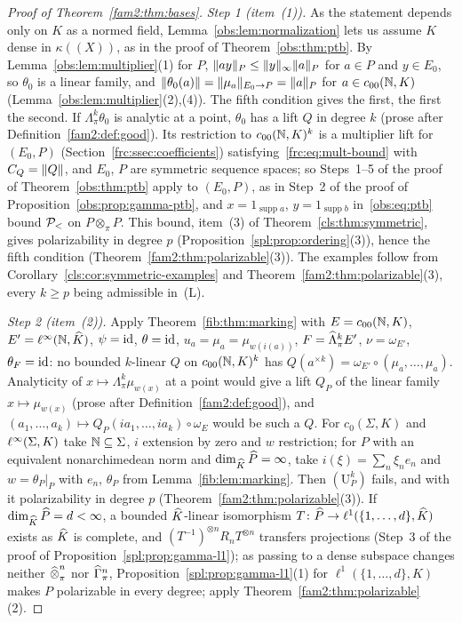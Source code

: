 \begin{proof}[Proof of Theorem~\ref{fam2:thm:bases}]
\emph{Step 1 (item~(1)).} As the statement depends only on $K$ as a normed field, Lemma~\ref{obs:lem:normalization} lets us
assume $K$ dense in $\kappa((X))$, as in the proof of Theorem~\ref{obs:thm:ptb}. By Lemma~\ref{obs:lem:multiplier}(1) for
$P$, $\lVert ay\rVert_P\le\lVert y\rVert_\infty\lVert a\rVert_P$ for $a\in P$ and $y\in E_0$, so $\theta_0$ is a linear family, and
$\lVert \theta_0(a)\rVert=\lVert \mu_a\rVert_{E_0\to P}=\lVert a\rVert_P$ for $a\in c_{00}(\mathbb N,K)$ (Lemma~\ref{obs:lem:multiplier}(2),(4)). The
fifth condition gives the first, the first the second. If $\Lambda^k_\pi\theta_0$ is analytic at a point, $\theta_0$ has a
lift $Q$ in degree $k$ (prose after Definition~\ref{fam2:def:good}). Its restriction to $c_{00}(\mathbb N,K)^k$ is a multiplier lift for
$(E_0,P)$ (Section~\ref{frc:ssec:coefficients}) satisfying~\eqref{frc:eq:mult-bound} with $C_Q=\lVert Q\rVert$, and $E_0$, $P$ are
symmetric sequence spaces; so Steps~1--5 of the proof of Theorem~\ref{obs:thm:ptb} apply to $(E_0,P)$, as in Step~2 of the
proof of Proposition~\ref{obs:prop:gamma-ptb}, and $x=1_{\operatorname{supp}a}$, $y=1_{\operatorname{supp}b}$
in~\eqref{obs:eq:ptb} bound $\mathcal P_<$ on $P\otimes_\pi P$. This bound, item~(3) of Theorem~\ref{cls:thm:symmetric}, gives
polarizability in degree $p$ (Proposition~\ref{spl:prop:ordering}(3)), hence the fifth condition
(Theorem~\ref{fam2:thm:polarizable}(3)). The examples follow from Corollary~\ref{cls:cor:symmetric-examples} and
Theorem~\ref{fam2:thm:polarizable}(3), every $k\ge p$ being admissible in~(L).

\emph{Step 2 (item~(2)).} Apply Theorem~\ref{fib:thm:marking} with $E=c_{00}(\mathbb N,K)$, $E'=\ell^\infty(\mathbb N,\widehat K)$, $\psi=\mathrm{id}$,
$\theta=\mathrm{id}$, $u_a=\mu_a=\mu_{w(i(a))}$, $F=\widehat\Lambda^k_\pi E'$, $\nu=\omega_{E'}$, $\theta_F=\mathrm{id}$: no bounded $k$-linear $Q$ on
$c_{00}(\mathbb N,K)^k$ has $Q(a^{\times k})=\omega_{E'}\circ(\mu_a,\dots,\mu_a)$. Analyticity of $x\mapsto\Lambda^k_\pi\mu_{w(x)}$
at a point would give a lift $Q_P$ of the linear family $x\mapsto\mu_{w(x)}$ (prose after Definition~\ref{fam2:def:good}),
and $(a_1,\dots,a_k)\mapsto Q_P(ia_1,\dots,ia_k)\circ\omega_E$ would be such a $Q$. For $c_0(\Sigma,K)$ and
$\ell^\infty(\Sigma,K)$ take $\mathbb N\subseteq\Sigma$, $i$ extension by zero and $w$ restriction; for $P$
with an equivalent nonarchimedean norm and $\dim_{\widehat K}\widehat P=\infty$, take $i(\xi)=\sum_n\xi_ne_n$ and $w=\theta_P|_P$
with $e_n$, $\theta_P$ from Lemma~\ref{fib:lem:marking}. Then $(\mathrm U^k_P)$ fails, and with it polarizability in degree
$p$ (Theorem~\ref{fam2:thm:polarizable}(3)). If $\dim_{\widehat K}\widehat P=d<\infty$, a bounded $\widehat K$-linear isomorphism
$T\colon\widehat P\to\ell^1(\{1,\dots,d\},\widehat K)$ exists as $\widehat K$ is complete, and $(T^{-1})^{\otimes n}R_nT^{\otimes n}$
transfers projections (Step~3 of the proof of Proposition~\ref{spl:prop:gamma-l1}); as passing to a dense subspace changes
neither $\mathbin{\widehat\otimes}^n_\pi$ nor $\widehat\Gamma^n_\pi$, Proposition~\ref{spl:prop:gamma-l1}(1) for $\ell^1(\{1,\dots,d\},K)$ makes $P$
polarizable in every degree; apply Theorem~\ref{fam2:thm:polarizable}(2).
\end{proof}

